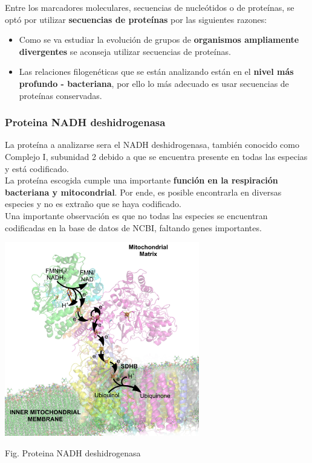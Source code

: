 \documentclass[a4paper]{article}
\begin{document}
\noindent Entre los marcadores moleculares, secuencias de nucleótidos o de proteínas, se optó por utilizar \textbf{secuencias de proteínas} por las siguientes razones:


\begin{itemize}
	\item Como se va estudiar la evolución de grupos de \textbf{organismos ampliamente divergentes} se aconseja utilizar secuencias de proteínas.
	\item Las relaciones filogenéticas que se están analizando están en el \textbf{nivel más profundo - bacteriana}, por ello lo más adecuado es usar secuencias de proteínas conservadas.
\end{itemize}


\subsubsection*{Proteina NADH deshidrogenasa}

La proteína a analizarse sera el NADH deshidrogenasa, también conocido como Complejo I, subunidad 2 debido a que se encuentra presente en todas las especias y está codificado. \\
La proteína escogida cumple una importante \textbf{función en la respiración bacteriana y mitocondrial}. Por ende, es posible encontrarla en diversas especies y no es extraño que se haya codificado.\\
Una importante observación es que no todas las especies se encuentran codificadas en la base de datos de NCBI, faltando genes importantes.

\begin{center}
	\includegraphics[width=8.5cm,height=8.5cm]{NADH.png}
	
	Fig. Proteina NADH deshidrogenasa
\end{center}
\end{document}
